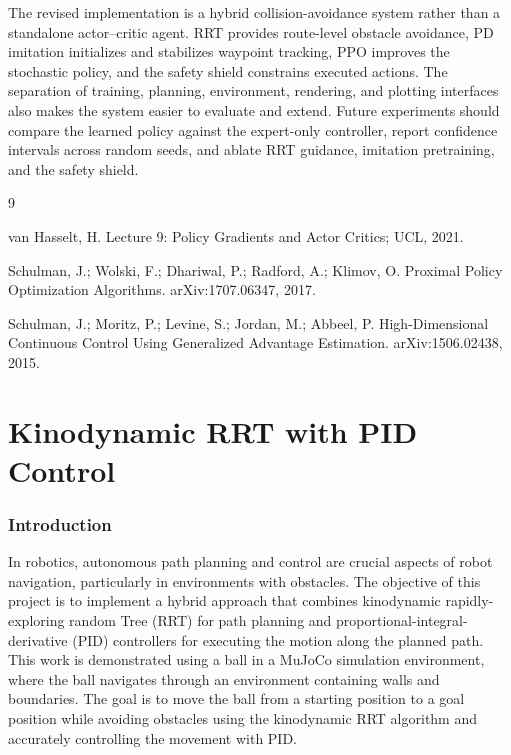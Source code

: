 \documentclass[12pt]{article}
\begin{document}
The revised implementation is a hybrid collision-avoidance system rather than a standalone actor--critic agent. RRT provides route-level obstacle avoidance, PD imitation initializes and stabilizes waypoint tracking, PPO improves the stochastic policy, and the safety shield constrains executed actions. The separation of training, planning, environment, rendering, and plotting interfaces also makes the system easier to evaluate and extend. Future experiments should compare the learned policy against the expert-only controller, report confidence intervals across random seeds, and ablate RRT guidance, imitation pretraining, and the safety shield.

\begin{thebibliography}{9}
\raggedright

van Hasselt, H. Lecture 9: Policy Gradients and Actor Critics; UCL, 2021.

Schulman, J.; Wolski, F.; Dhariwal, P.; Radford, A.; Klimov, O.
Proximal Policy Optimization Algorithms. arXiv:1707.06347, 2017.

Schulman, J.; Moritz, P.; Levine, S.; Jordan, M.; Abbeel, P.
High-Dimensional Continuous Control Using Generalized Advantage Estimation.
arXiv:1506.02438, 2015.

\end{thebibliography}

\clearpage
\part{Kinodynamic RRT with PID Control}

\section{Introduction}
In robotics, autonomous path planning and control are crucial aspects of robot navigation, particularly in environments with obstacles. The objective of this project is to implement a hybrid approach that combines kinodynamic rapidly-exploring random Tree (RRT) for path planning and proportional-integral-derivative (PID) controllers for executing the motion along the planned path. This work is demonstrated using a ball in a MuJoCo simulation environment, where the ball navigates through an environment containing walls and boundaries. The goal is to move the ball from a starting position to a goal position while avoiding obstacles using the kinodynamic RRT algorithm and accurately controlling the movement with PID.
\end{document}
